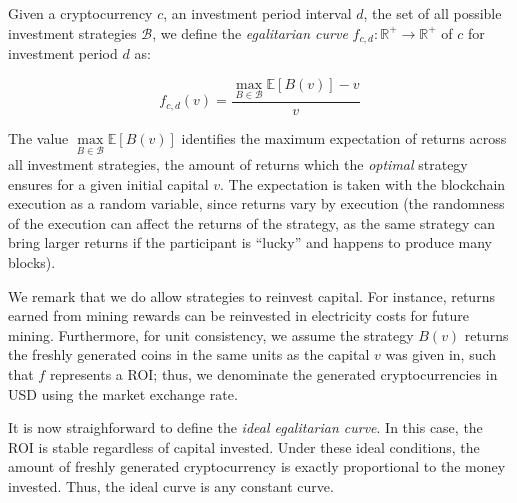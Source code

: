 \begin{definition}
    Given a cryptocurrency $c$, an investment period interval $d$, the set of
    all possible investment strategies $\mathcal{B}$, we define the \emph{egalitarian curve}
    $f_{c,d}: \mathbb{R}^+ \longrightarrow \mathbb{R}^+$ of $c$ for
    investment period $d$ as:

    \[
        f_{c,d}(v) = \frac{\underset{B \in \mathcal{B}}{\max}{\mathbb{E}[B(v)]} - v}{v}
    \]
\end{definition}

The value $\underset{B \in \mathcal{B}}{\max}{\mathbb{E}[B(v)]}$ identifies the maximum expectation of
returns across all investment strategies, \ie the amount of
returns which the \emph{optimal} strategy ensures for a given initial capital $v$.
The expectation is taken with the blockchain execution as a random variable,
since returns vary by execution (the randomness of the execution can affect the
returns of the strategy, as the same strategy can bring larger returns if the
participant is ``lucky'' and happens to produce many blocks).

We remark that we do allow strategies to reinvest capital. For instance,
returns earned from mining rewards can be reinvested in electricity costs for
future mining. Furthermore, for unit consistency, we assume the strategy
$B(v)$ returns the freshly generated coins in the same units as the capital $v$
was given in, such that $f$ represents a ROI; thus, we denominate the
generated cryptocurrencies in USD using the market exchange rate.

It is now straighforward to define the \emph{ideal egalitarian curve}. In this
case, the ROI is stable regardless of capital invested. Under these ideal
conditions, the amount of freshly generated cryptocurrency is exactly
proportional to the money invested. Thus, the ideal curve is any constant
curve.

%

